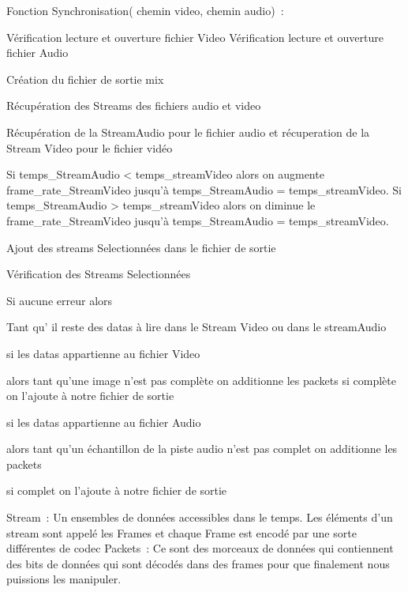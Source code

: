 \begin{verbnobox}[\small]

Fonction Synchronisation( chemin video, chemin audio) :

Vérification lecture et ouverture fichier Video
Vérification lecture et ouverture  fichier Audio

Création du fichier de sortie mix

Récupération des Streams des fichiers audio et video

Récupération de la StreamAudio pour le fichier audio et récuperation de la Stream Video pour le fichier vidéo

Si temps_StreamAudio < temps_streamVideo alors on augmente frame_rate_StreamVideo jusqu'à temps_StreamAudio = temps_streamVideo.
Si temps_StreamAudio > temps_streamVideo alors on diminue le  frame_rate_StreamVideo jusqu'à temps_StreamAudio = temps_streamVideo.

Ajout des streams Selectionnées dans le fichier de sortie

Vérification des Streams Selectionnées

Si aucune erreur alors 

	Tant qu' il reste des datas à lire dans le Stream Video ou dans le streamAudio
		
		si les datas appartienne au fichier Video
		
			alors tant qu'une image n'est pas complète on additionne les packets
			si complète on l'ajoute à notre fichier de sortie


		si les datas appartienne au fichier Audio
		
			alors tant qu'un échantillon de la piste audio n'est pas complet on additionne les packets

			si complet on l'ajoute à notre fichier de sortie

\end{verbnobox}

Stream : Un ensembles de données accessibles dans le temps. Les éléments d'un stream sont appelé les Frames et chaque Frame est encodé par une sorte différentes de codec
Packets : Ce sont des morceaux de données qui contiennent des bits de données qui sont décodés dans des frames pour que finalement nous puissions les manipuler.